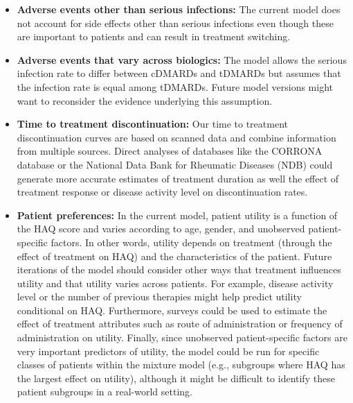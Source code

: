 \documentclass[11pt,final,fleqn]{article}
\theoremstyle{plain}
\begin{document}
\begin{itemize}
\item \textbf{Adverse events other than serious infections:} The current model does not account for side effects other than serious infections even though these are important to patients and can result in treatment switching. 
\item \textbf{Adverse events that vary across biologics:} The model allows the serious infection rate to differ between cDMARDs and tDMARDs but assumes that the infection rate is equal among tDMARDs. Future model versions might want to reconsider the evidence underlying this assumption.
\item \textbf{Time to treatment discontinuation:} Our time to treatment discontinuation curves are based on scanned data and combine information from multiple sources. Direct analyses of databases like the CORRONA database or the National Data Bank for Rheumatic Diseases (NDB) could generate more accurate estimates of treatment duration as well the effect of treatment response or disease activity level on discontinuation rates.  
\item \textbf{Patient preferences:} In the current model, patient utility is a function of the HAQ score and varies according to age, gender, and unobserved patient-specific factors. In other words, utility depends on treatment (through the effect of treatment on HAQ) and the characteristics of the patient. Future iterations of the model should consider other ways that treatment influences utility and that utility varies across patients. For example, disease activity level or the number of previous therapies might help predict utility conditional on HAQ. Furthermore, surveys could be used to estimate the effect of treatment attributes such as route of administration or frequency of administration on utility. Finally, since unobserved patient-specific factors are very important predictors of utility, the model could be run for specific classes of patients within the mixture model (e.g., subgroups where HAQ has the largest effect on utility), although it might be difficult to identify these patient subgroups in a real-world setting. 


\end{itemize}
\end{document}

